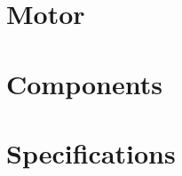 \blindtext

\section{Motor}

\blindtext

\blindtext

\section{Components}

\blindtext

\blindtext

\section{Specifications}

\blindtext

\blindtext
